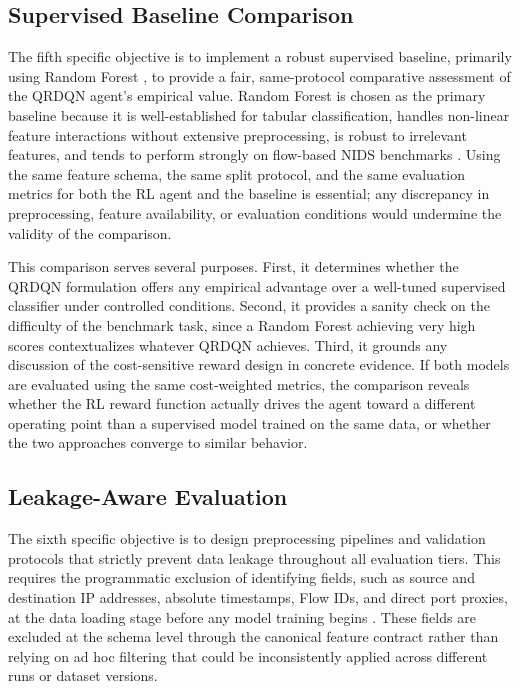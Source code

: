 \subsection{Supervised Baseline Comparison}
The fifth specific objective is to implement a robust supervised baseline, primarily using Random Forest \parencite{LiuLang2019IDSSurvey}, to provide a fair, same-protocol comparative assessment of the QRDQN agent's empirical value. Random Forest is chosen as the primary baseline because it is well-established for tabular classification, handles non-linear feature interactions without extensive preprocessing, is robust to irrelevant features, and tends to perform strongly on flow-based NIDS benchmarks \parencite{Apruzzese2022CrossEvaluationNIDS}. Using the same feature schema, the same split protocol, and the same evaluation metrics for both the RL agent and the baseline is essential; any discrepancy in preprocessing, feature availability, or evaluation conditions would undermine the validity of the comparison.

This comparison serves several purposes. First, it determines whether the QRDQN formulation offers any empirical advantage over a well-tuned supervised classifier under controlled conditions. Second, it provides a sanity check on the difficulty of the benchmark task, since a Random Forest achieving very high scores contextualizes whatever QRDQN achieves. Third, it grounds any discussion of the cost-sensitive reward design in concrete evidence. If both models are evaluated using the same cost-weighted metrics, the comparison reveals whether the RL reward function actually drives the agent toward a different operating point than a supervised model trained on the same data, or whether the two approaches converge to similar behavior.

\subsection{Leakage-Aware Evaluation}
The sixth specific objective is to design preprocessing pipelines and validation protocols that strictly prevent data leakage throughout all evaluation tiers. This requires the programmatic exclusion of identifying fields, such as source and destination IP addresses, absolute timestamps, Flow IDs, and direct port proxies, at the data loading stage before any model training begins \parencite{Arp2020DosDontsMLSecurity,Kaufman2011LeakageDataMining}. These fields are excluded at the schema level through the canonical feature contract rather than relying on ad hoc filtering that could be inconsistently applied across different runs or dataset versions.

